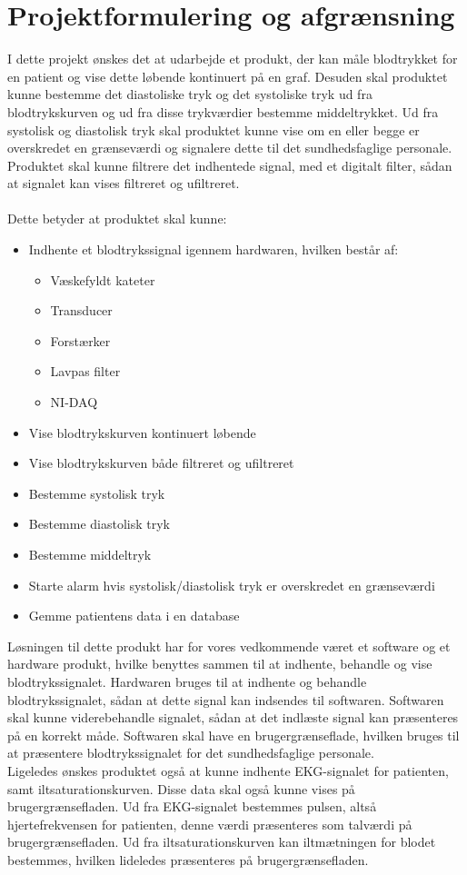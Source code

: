 \chapter{Projektformulering og afgrænsning}
I dette projekt ønskes det at udarbejde et produkt, der kan måle blodtrykket for en patient og vise dette løbende kontinuert på en graf. Desuden skal produktet kunne bestemme det diastoliske tryk og det systoliske tryk ud fra blodtrykskurven og ud fra disse trykværdier bestemme middeltrykket. Ud fra systolisk og diastolisk tryk skal produktet kunne vise om en eller begge er overskredet en grænseværdi og signalere dette til det sundhedsfaglige personale. Produktet skal kunne filtrere det indhentede signal, med et digitalt filter, sådan at signalet kan vises filtreret og ufiltreret.  \\\\
Dette betyder at produktet skal kunne:
\begin{itemize}
\item Indhente et blodtrykssignal igennem hardwaren, hvilken består af:
\begin{itemize}
\item Væskefyldt kateter
\item Transducer 
\item Forstærker
\item Lavpas filter
\item NI-DAQ
\end{itemize}
\item Vise blodtrykskurven kontinuert løbende
\item Vise blodtrykskurven både filtreret og ufiltreret
\item Bestemme systolisk tryk
\item Bestemme diastolisk tryk
\item Bestemme middeltryk
\item Starte alarm hvis systolisk/diastolisk tryk er overskredet en grænseværdi
\item Gemme patientens data i en database
\end{itemize}
Løsningen til dette produkt har for vores vedkommende været et software og et hardware produkt, hvilke benyttes sammen til at indhente, behandle og vise blodtrykssignalet. Hardwaren bruges til at indhente og behandle blodtrykssignalet, sådan at dette signal kan indsendes til softwaren. Softwaren skal kunne viderebehandle signalet, sådan at det indlæste signal kan præsenteres på en korrekt måde. Softwaren skal have en brugergrænseflade, hvilken bruges til at præsentere blodtrykssignalet for det sundhedsfaglige personale. \\
Ligeledes ønskes produktet også at kunne indhente EKG-signalet for patienten, samt iltsaturationskurven. Disse data skal også kunne vises på brugergrænsefladen. Ud fra EKG-signalet bestemmes pulsen, altså hjertefrekvensen for patienten, denne værdi præsenteres som talværdi på brugergrænsefladen. Ud fra iltsaturationskurven kan iltmætningen for blodet bestemmes, hvilken lideledes præsenteres på brugergrænsefladen. 
